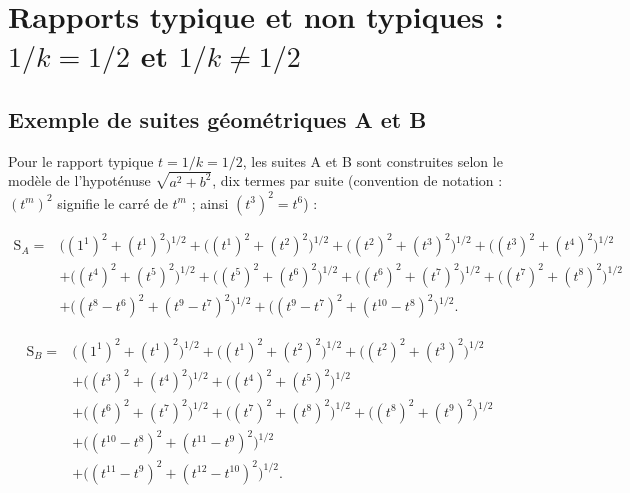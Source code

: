 \documentclass[11pt,a4paper]{article}
\newcommand{\SA}{\mathrm{S}_A}
\newcommand{\SB}{\mathrm{S}_B}
\begin{document}
\setcounter{tocdepth}{3}
\renewcommand{\contentsname}{Table des mati\`eres}
\tableofcontents
\newpage



\section{Rapports typique et non typiques : \texorpdfstring{$1/k = 1/2$}{1/k = 1/2} et \texorpdfstring{$1/k \neq 1/2$}{1/k != 1/2}}

\subsection{Exemple de suites géométriques A et B}

Pour le rapport typique $t = 1/k = 1/2$, les suites A et B sont construites
selon le modèle de l'hypoténuse $\sqrt{a^{2}+b^{2}}$, dix termes par suite
(convention de notation : $(t^{m})^{2}$ signifie le carré de $t^{m}$ ; ainsi
$(t^{3})^{2} = t^{6}$) :

\vspace{0.3cm}
\begin{boiteformule}
\[
\begin{aligned}
\SA ={}& \bigl((1^{1})^{2} + (t^{1})^{2}\bigr)^{1/2}
 + \bigl((t^{1})^{2} + (t^{2})^{2}\bigr)^{1/2}
 + \bigl((t^{2})^{2} + (t^{3})^{2}\bigr)^{1/2}
 + \bigl((t^{3})^{2} + (t^{4})^{2}\bigr)^{1/2} \\
& + \bigl((t^{4})^{2} + (t^{5})^{2}\bigr)^{1/2}
 + \bigl((t^{5})^{2} + (t^{6})^{2}\bigr)^{1/2}
 + \bigl((t^{6})^{2} + (t^{7})^{2}\bigr)^{1/2}
 + \bigl((t^{7})^{2} + (t^{8})^{2}\bigr)^{1/2} \\
& + \bigl((t^{8} - t^{6})^{2} + (t^{9} - t^{7})^{2}\bigr)^{1/2}
 + \bigl((t^{9} - t^{7})^{2} + (t^{10} - t^{8})^{2}\bigr)^{1/2}.
\end{aligned}
\]
\end{boiteformule}

\vspace{0.3cm}
\begin{boiteformule}
\[
\begin{aligned}
\SB ={}& \bigl((1^{1})^{2} + (t^{1})^{2}\bigr)^{1/2}
 + \bigl((t^{1})^{2} + (t^{2})^{2}\bigr)^{1/2}
 + \bigl((t^{2})^{2} + (t^{3})^{2}\bigr)^{1/2} \\
& + \bigl((t^{3})^{2} + (t^{4})^{2}\bigr)^{1/2}
 + \bigl((t^{4})^{2} + (t^{5})^{2}\bigr)^{1/2} \\
& + \bigl((t^{6})^{2} + (t^{7})^{2}\bigr)^{1/2}
 + \bigl((t^{7})^{2} + (t^{8})^{2}\bigr)^{1/2}
 + \bigl((t^{8})^{2} + (t^{9})^{2}\bigr)^{1/2} \\
& + \bigl((t^{10} - t^{8})^{2} + (t^{11} - t^{9})^{2}\bigr)^{1/2} \\
& + \bigl((t^{11} - t^{9})^{2} + (t^{12} - t^{10})^{2}\bigr)^{1/2}.
\end{aligned}
\]
\end{boiteformule}
\end{document}
